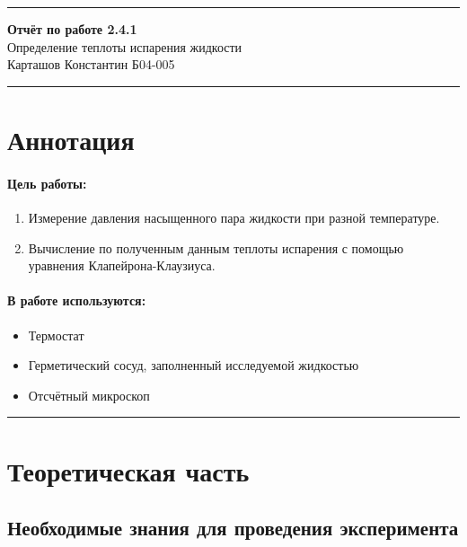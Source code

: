 \documentclass[a4paper,12pt]{article} %
\begin{document}
\hrule 	
\medskip
\begin{raggedright}
{\large \textbf{Отчёт по работе 2.4.1}}
\\
\medskip
{\Large Определение теплоты испарения жидкости} 
\\
\medskip
{\large Карташов Константин Б04-005}
\medskip
\hrule
\medskip
\end{raggedright}


\section{Аннотация}

\paragraph{Цель работы:}
\begin{enumerate}
\itemsep0em

\item Измерение давления насыщенного пара жидкости при разной температуре.
\item Вычисление по полученным данным теплоты испарения с помощью уравнения Клапейрона-Клаузиуса.
\end{enumerate}

\paragraph{В работе используются:}
\begin{itemize}
\itemsep0em
\renewcommand{\labelitemi}{$\triangleright$}

\item Термостат
\item Герметический сосуд, заполненный исследуемой жидкостью
\item Отсчётный микроскоп

\end{itemize}

\medskip\hrule\medskip

\section{Теоретическая часть}

\subsection{Необходимые знания для проведения эксперимента}
\end{document}
